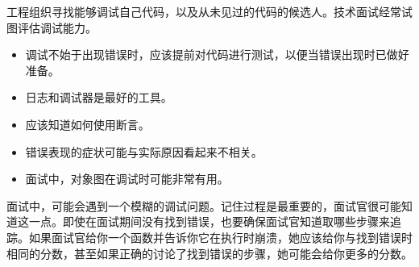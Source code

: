 工程组织寻找能够调试自己代码，以及从未见过的代码的候选人。技术面试经常试图评估调试能力。


\begin{itemize}
\item
调试不始于出现错误时，应该提前对代码进行测试，以便当错误出现时已做好准备。

\item
日志和调试器是最好的工具。

\item
应该知道如何使用断言。

\item
错误表现的症状可能与实际原因看起来不相关。

\item
面试中，对象图在调试时可能非常有用。
\end{itemize}


面试中，可能会遇到一个模糊的调试问题。记住过程是最重要的，面试官很可能知道这一点。即使在面试期间没有找到错误，也要确保面试官知道取哪些步骤来追踪。如果面试官给你一个函数并告诉你它在执行时崩溃，她应该给你与找到错误时相同的分数，甚至如果正确的讨论了找到错误的步骤，她可能会给你更多的分数。
